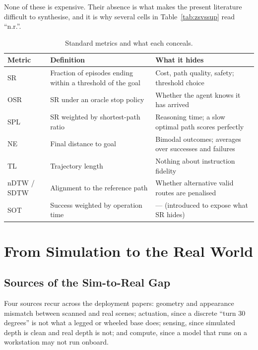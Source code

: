 \documentclass[journal]{IEEEtran}
\begin{document}
None of these is expensive. Their absence is what makes the present
literature difficult to synthesise, and it is why several cells in
Table~\ref{tab:zsvssup} read ``n.r.''.

\begin{table}[!t]
  \caption{Standard metrics and what each conceals.}
  \label{tab:metrics}
  \centering
  \footnotesize
  \begin{tabular}{lp{2.1cm}p{3.0cm}}
    \toprule
    Metric & Definition & What it hides \\
    \midrule
    SR   & Fraction of episodes ending within a threshold of the goal & Cost, path quality, safety; threshold choice \\
    OSR  & SR under an oracle stop policy & Whether the agent knows it has arrived \\
    SPL  & SR weighted by shortest-path ratio & Reasoning time; a slow optimal path scores perfectly \\
    NE   & Final distance to goal & Bimodal outcomes; averages over successes and failures \\
    TL   & Trajectory length & Nothing about instruction fidelity \\
    nDTW / SDTW & Alignment to the reference path & Whether alternative valid routes are penalised \\
    SOT~\cite{wang2026hydra} & Success weighted by operation time & --- (introduced to expose what SR hides) \\
    \bottomrule
  \end{tabular}
\end{table}

\section{From Simulation to the Real World}\label{sec:real}

\subsection{Sources of the Sim-to-Real Gap}
Four sources recur across the deployment papers: geometry and appearance
mismatch between scanned and real scenes; actuation, since a discrete
``turn 30 degrees'' is not what a legged or wheeled base does; sensing,
since simulated depth is clean and real depth is not; and compute, since a
model that runs on a workstation may not run onboard.
\end{document}
